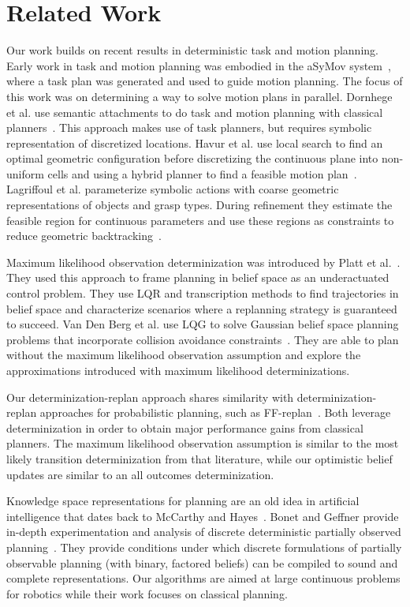 \section{Related Work}
Our work builds on recent results in deterministic task and motion
planning. Early work in task and motion planning was embodied in the
aSyMov system~\cite{gravot2005asymov}, where a task plan was generated
and used to guide motion planning. The focus of this work was on
determining a way to solve motion plans in parallel. Dornhege et
al. use semantic attachments to do task and motion planning with
classical planners~\cite{dornhege2012semantic}. This approach makes
use of task planners, but requires symbolic representation of discretized
locations. Havur et al. use local search to
find an optimal geometric configuration before discretizing the
continuous plane into non-uniform cells and using a hybrid planner to
find a feasible motion plan~\cite{havur2014geometric}. Lagriffoul et
al. parameterize symbolic actions with coarse geometric
representations of objects and grasp types. During refinement they
estimate the feasible region for continuous parameters and use these
regions as constraints to reduce geometric
backtracking~\cite{lagriffoul2014orientation}.

Maximum likelihood observation determinization was introduced by Platt
et al.~\cite{platt2010belief}. They used this approach to frame
planning in belief space as an underactuated control problem. They use
LQR and transcription methods to find trajectories in belief space and
characterize scenarios where a replanning strategy is guaranteed to
succeed. Van Den Berg et al. use LQG to solve Gaussian belief space
planning problems that incorporate collision avoidance
constraints~\cite{van2012motion}. They are able to plan without the
maximum likelihood observation assumption and explore the
approximations introduced with maximum likelihood determinizations.
 
Our determinization-replan approach shares similarity with
determinization-replan approaches for probabilistic planning, such as
FF-replan~\cite{yoon2007ff}. Both leverage determinization in order to
obtain major performance gains from classical planners. The maximum
likelihood observation assumption is similar to the most likely
transition determinization from that literature, while our optimistic
belief updates are similar to an all outcomes determinization.
 
Knowledge space representations for planning are an old idea in
artificial intelligence that dates back to McCarthy and
Hayes~\cite{mccarthy1968some}. Bonet and Geffner provide in-depth
experimentation and analysis of discrete deterministic partially
observed planning~\cite{bonet2011planning}.  They provide conditions
under which discrete formulations of partially observable planning
(with binary, factored beliefs) can be compiled to sound and complete
representations. Our algorithms are aimed at large continuous problems
for robotics while their work focuses on classical planning.

